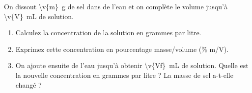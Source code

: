 On dissout \qty{\v{m}}{g} de sel dans de l'eau et on complète le volume jusqu'à \qty{\v{V}}{mL} de solution.

\begin{enumerate}[label=\alph*)]
    \item Calculez la concentration de la solution en grammes par litre.
    \item Exprimez cette concentration en pourcentage masse/volume (\% m/V).
    \item On ajoute ensuite de l'eau jusqu'à obtenir \qty{\v{Vf}}{mL} de solution. Quelle est la nouvelle concentration en grammes par litre ? La masse de sel a-t-elle changé ?
\end{enumerate}
